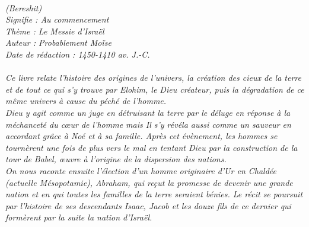 \BFont
\noindent\hrulefill
\textit{
\bigskip
{\centering{}
\\(Bereshit)
\\Signifie : Au commencement
\\Thème : Le Messie d'Israël
\\Auteur : Probablement Moïse
\\Date de rédaction : 1450-1410 av. J.-C.\\}
}
\textit{
\\Ce livre relate l’histoire des origines de l’univers, la création des cieux de la terre et de tout ce qui s’y trouve par Elohim, le Dieu créateur, puis la dégradation de ce même univers à cause du péché de l’homme.
\bigskip
\\Dieu y agit comme un juge en détruisant la terre par le déluge en réponse à la méchanceté du cœur de l’homme mais Il s’y révéla aussi comme un sauveur en accordant grâce à Noé et à sa famille. Après cet évènement, les hommes se tournèrent une fois de plus vers le mal en tentant Dieu par la construction de la tour de Babel, œuvre à l’origine de la dispersion des nations. 
\bigskip
\\On nous raconte ensuite l’élection d’un homme originaire d’Ur en Chaldée (actuelle Mésopotamie), Abraham, qui reçut la promesse de devenir une grande nation et en qui toutes les familles de la terre seraient bénies. Le récit se poursuit par l’histoire de ses descendants Isaac, Jacob et les douze fils de ce dernier qui formèrent par la suite la nation d’Israël.\bigskip
}
\par\nobreak\noindent\hrulefill
